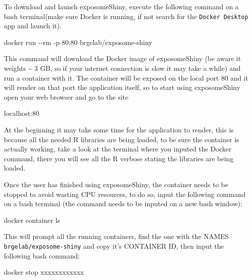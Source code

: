 \documentclass[
]{book}
\newenvironment{Shaded}{\begin{snugshade}}{\end{snugshade}}
\newcommand{\ExtensionTok}[1]{#1}
\newcommand{\NormalTok}[1]{#1}
\begin{document}
To download and launch exposomeShiny, execute the following command on a bash terminal(make sure Docker is running, if not search for the \texttt{Docker\ Desktop} app and launch it).

\begin{Shaded}
\begin{Highlighting}[]
\ExtensionTok{docker}\NormalTok{ run {-}{-}rm {-}p 80:80 brgelab/exposome{-}shiny}
\end{Highlighting}
\end{Shaded}

This command will download the Docker image of exposomeShiny (be aware it weights \textasciitilde{} 3 GB, so if your internet connection is slow it may take a while) and run a container with it. The container will be exposed on the local port 80 and it will render on that port the application itself, so to start using exposomeShiny open your web browser and go to the site

\begin{Shaded}
\begin{Highlighting}[]
\ExtensionTok{localhost}\NormalTok{:80}
\end{Highlighting}
\end{Shaded}

At the beginning it may take some time for the application to render, this is because all the needed R libraries are being loaded, to be sure the container is actually working, take a look at the terminal where you inputed the Docker command, there you will see all the R verbose stating the libraries are being loaded.

Once the user has finished using exposomeShiny, the container needs to be stopped to avoid wasting CPU resources, to do so, input the following command on a bash terminal (the command needs to be inputed on a new bash window):

\begin{Shaded}
\begin{Highlighting}[]
\ExtensionTok{docker}\NormalTok{ container ls}
\end{Highlighting}
\end{Shaded}

This will prompt all the running containers, find the one with the NAMES \texttt{brgelab/exposome-shiny} and copy it's CONTAINER ID, then input the following bash command:

\begin{Shaded}
\begin{Highlighting}[]
\ExtensionTok{docker}\NormalTok{ stop xxxxxxxxxxxx}
\end{Highlighting}
\end{Shaded}
\end{document}

